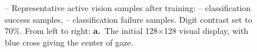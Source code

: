 \begin{figure}[t!]%
	\caption{
		{\A-- \E Representative active vision samples after training}: \A-- \B  classification success samples, \C-- \E classification failure samples. Digit contrast set to $70\%$.  From left to right: {\bf a.}~The initial 128$\times$128 visual display, with blue cross giving the center of gaze.
}
\end{figure}
